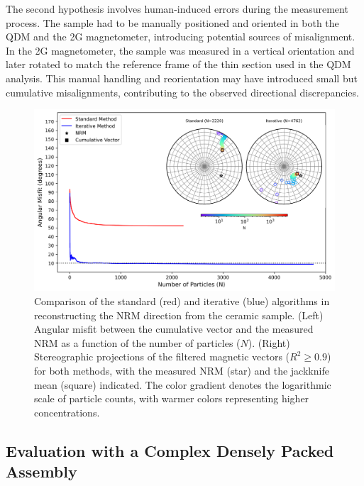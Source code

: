 The second hypothesis involves human-induced errors during the measurement process. The sample had to be manually positioned and oriented in both the QDM and the 2G magnetometer, introducing potential sources of misalignment. In the 2G magnetometer, the sample was measured in a vertical orientation and later rotated to match the reference frame of the thin section used in the QDM analysis. This manual handling and reorientation may have introduced small but cumulative misalignments, contributing to the observed directional discrepancies.

\begin{figure}[tb!]
  \centering
  \includegraphics[width=1\linewidth]{paper/figures/ceramic-data-stereoplot.png}
  \caption{
  Comparison of the standard (red) and iterative (blue) algorithms in reconstructing the NRM direction from the ceramic sample. (Left) Angular misfit between the cumulative vector and the measured NRM as a function of the number of particles ($N$). (Right) Stereographic projections of the filtered magnetic vectors ($R^2 \geq 0.9$) for both methods, with the measured NRM (star) and the jackknife mean (square) indicated. The color gradient denotes the logarithmic scale of particle counts, with warmer colors representing higher concentrations.
  }
  \label{ceramic-data-stereograms}
\end{figure}

\subsection{Evaluation with a Complex Densely Packed Assembly}

